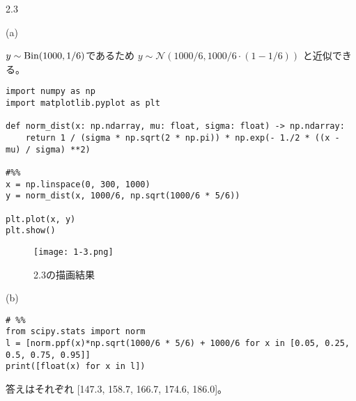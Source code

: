 \documentclass[pdflatex,ja=standard]{bxjsarticle}
\begin{document}
2.3

(a)

$y \sim \rm{Bin}(1000, 1/6) $であるため $y \sim \mathcal{N} (1000/6, 1000/6\cdot(1-1/6))$
と近似できる。

\begin{lstlisting}
import numpy as np
import matplotlib.pyplot as plt

def norm_dist(x: np.ndarray, mu: float, sigma: float) -> np.ndarray:
    return 1 / (sigma * np.sqrt(2 * np.pi)) * np.exp(- 1./2 * ((x - mu) / sigma) **2)

#%% 
x = np.linspace(0, 300, 1000)
y = norm_dist(x, 1000/6, np.sqrt(1000/6 * 5/6))

plt.plot(x, y)
plt.show()

\end{lstlisting}

\begin{figure}
    \centering
    \texttt{[image: 1-3.png]}
    \caption{2.3の描画結果}
    \label{fig:placeholder}
\end{figure}

(b)

\begin{lstlisting}
# %%
from scipy.stats import norm
l = [norm.ppf(x)*np.sqrt(1000/6 * 5/6) + 1000/6 for x in [0.05, 0.25, 0.5, 0.75, 0.95]]
print([float(x) for x in l])
\end{lstlisting}

答えはそれぞれ [147.3, 158.7, 166.7, 174.6, 186.0]。
\end{document}
